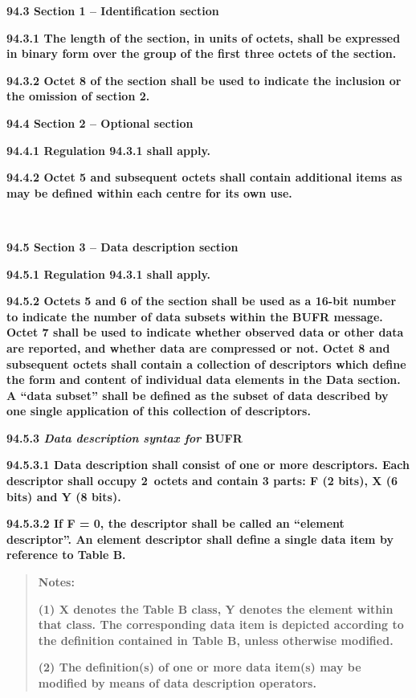 \textbf{94.3 Section 1 -- Identification section}

\textbf{94.3.1 The length of the section, in units of octets, shall be expressed in binary form over the group of the first three octets of the section.}

\textbf{94.3.2 Octet 8 of the section shall be used to indicate the inclusion or the omission of section 2.}

\textbf{94.4 Section 2 -- Optional section}

\textbf{94.4.1 Regulation 94.3.1 shall apply.}

\textbf{94.4.2 Octet 5 and subsequent octets shall contain additional items as may be defined within each centre for its own use.}

\textbf{\\
}

\textbf{94.5 Section 3 -- Data description section}

\textbf{94.5.1 Regulation 94.3.1 shall apply.}

\textbf{94.5.2 Octets 5 and 6 of the section shall be used as a 16-bit number to indicate the number of data subsets within the BUFR message. Octet 7 shall be used to indicate whether observed data or other data are reported, and whether data are compressed or not. Octet 8 and subsequent octets shall contain a collection of descriptors which define the form and content of individual data elements in the Data section. A ``data subset'' shall be defined as the subset of data described by one single application of this collection of descriptors.}

\textbf{94.5.3 \emph{Data description syntax for} BUFR}

\textbf{94.5.3.1 Data description shall consist of one or more descriptors. Each descriptor shall occupy 2~octets and contain 3 parts: F (2 bits), X (6 bits) and Y (8 bits).}

\textbf{94.5.3.2 If F = 0, the descriptor shall be called an ``element descriptor''. An element descriptor shall define a single data item by reference to Table B.}

\begin{quote}
\textbf{Notes:}

\textbf{(1) X denotes the Table B class, Y denotes the element within that class. The corresponding data item is depicted according to the definition contained in Table B, unless otherwise modified.}

\textbf{(2) The definition(s) of one or more data item(s) may be modified by means of data description operators.}
\end{quote}

